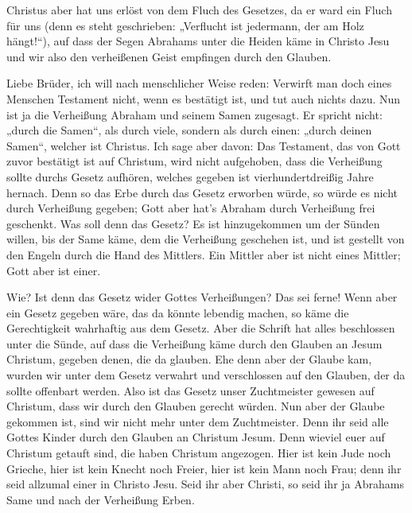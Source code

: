  Christus aber hat uns erlöst von dem Fluch des Gesetzes,
da er ward ein Fluch für uns (denn es steht geschrieben: „Verflucht ist
jedermann, der am Holz hängt!{}``),  auf dass der Segen
Abrahams unter die Heiden käme in Christo Jesu und wir also den
verheißenen Geist empfingen durch den Glauben.

 Liebe Brüder, ich will nach menschlicher Weise reden:
Verwirft man doch eines Menschen Testament nicht, wenn es bestätigt ist,
und tut auch nichts dazu.  Nun ist ja die Verheißung
Abraham und seinem Samen zugesagt. Er spricht nicht: „durch die Samen``,
als durch viele, sondern als durch einen: „durch deinen Samen``, welcher
ist Christus.  Ich sage aber davon: Das Testament, das
von Gott zuvor bestätigt ist auf Christum, wird nicht aufgehoben, dass
die Verheißung sollte durchs Gesetz aufhören, welches gegeben ist
vierhundertdreißig Jahre hernach.  Denn so das Erbe durch
das Gesetz erworben würde, so würde es nicht durch Verheißung gegeben;
Gott aber hat's Abraham durch Verheißung frei geschenkt. 
Was soll denn das Gesetz? Es ist hinzugekommen um der Sünden willen, bis
der Same käme, dem die Verheißung geschehen ist, und ist gestellt von
den Engeln durch die Hand des Mittlers.  Ein Mittler aber
ist nicht eines Mittler; Gott aber ist einer.

 Wie? Ist denn das Gesetz wider Gottes Verheißungen? Das
sei ferne! Wenn aber ein Gesetz gegeben wäre, das da könnte lebendig
machen, so käme die Gerechtigkeit wahrhaftig aus dem Gesetz.
 Aber die Schrift hat alles beschlossen unter die Sünde,
auf dass die Verheißung käme durch den Glauben an Jesum Christum,
gegeben denen, die da glauben.  Ehe denn aber der Glaube
kam, wurden wir unter dem Gesetz verwahrt und verschlossen auf den
Glauben, der da sollte offenbart werden.  Also ist das
Gesetz unser Zuchtmeister gewesen auf Christum, dass wir durch den
Glauben gerecht würden.  Nun aber der Glaube gekommen
ist, sind wir nicht mehr unter dem Zuchtmeister.  Denn
ihr seid alle Gottes Kinder durch den Glauben an Christum Jesum.
 Denn wieviel euer auf Christum getauft sind, die haben
Christum angezogen.  Hier ist kein Jude noch Grieche,
hier ist kein Knecht noch Freier, hier ist kein Mann noch Frau; denn ihr
seid allzumal einer in Christo Jesu.  Seid ihr aber
Christi, so seid ihr ja Abrahams Same und nach der Verheißung Erben.

